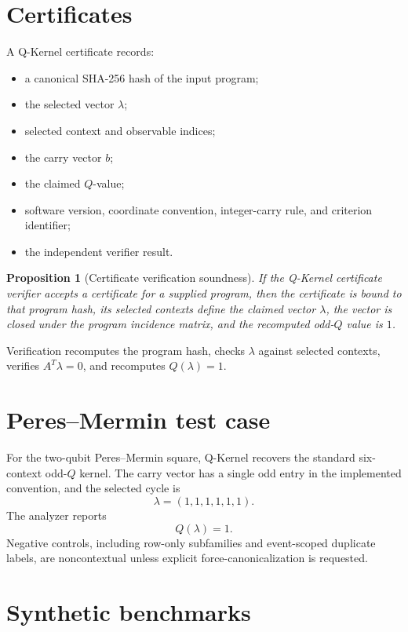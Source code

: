 \documentclass[11pt]{article}
\newtheorem{proposition}{Proposition}
\begin{document}
\section{Certificates}

A Q-Kernel certificate records:
\begin{itemize}[leftmargin=*]
  \item a canonical SHA-256 hash of the input program;
  \item the selected vector \(\lambda\);
  \item selected context and observable indices;
  \item the carry vector \(b\);
  \item the claimed \(Q\)-value;
  \item software version, coordinate convention, integer-carry rule, and criterion identifier;
  \item the independent verifier result.
\end{itemize}

\begin{proposition}[Certificate verification soundness]
\label{prop:certificate-soundness}
If the Q-Kernel certificate verifier accepts a certificate for a supplied program, then the certificate is bound to that program hash, its selected contexts define the claimed vector \(\lambda\), the vector is closed under the program incidence matrix, and the recomputed odd-\(Q\) value is \(1\).
\end{proposition}

Verification recomputes the program hash, checks \(\lambda\) against selected contexts, verifies \(A^T\lambda=0\), and recomputes \(Q(\lambda)=1\).

\section{Peres--Mermin test case}

For the two-qubit Peres--Mermin square, Q-Kernel recovers the standard six-context odd-\(Q\) kernel.  The carry vector has a single odd entry in the implemented convention, and the selected cycle is
\[
  \lambda=(1,1,1,1,1,1).
\]
The analyzer reports
\[
  Q(\lambda)=1.
\]
Negative controls, including row-only subfamilies and event-scoped duplicate labels, are noncontextual unless explicit force-canonicalization is requested.

\section{Synthetic benchmarks}
\end{document}
